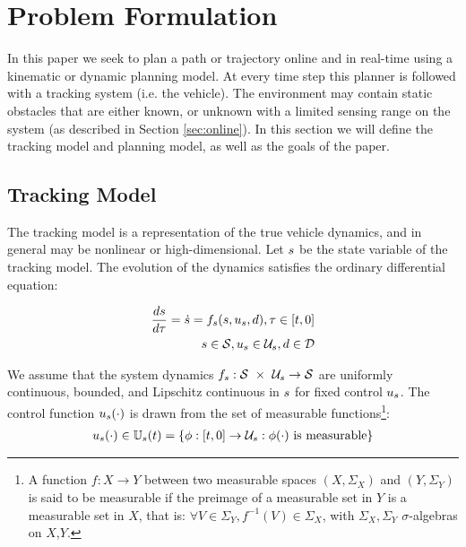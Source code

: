 \section{Problem Formulation \label{sec:formulation}}
In this paper we seek to plan a path or trajectory online and in real-time using a kinematic or dynamic planning model. At every time step this planner is followed with a tracking system (i.e. the vehicle). The environment may contain static obstacles that are either known, or unknown with a limited sensing range on the system (as described in Section \ref{sec:online}). In this section we will define the tracking model and planning model, as well as the goals of the paper.

\subsection{Tracking Model}
The tracking model is a representation of the true vehicle dynamics, and in general may be nonlinear or high-dimensional. Let $s$ be the state variable of the tracking model. The evolution of the dynamics satisfies the ordinary differential equation:

\begin{equation}
\begin{aligned}
\label{eq:tdyn}
\frac{ds}{d\tau} = \dot{s} = f_s(s, u_s, d), \tau \in [t, 0] \\
s \in \mathcal{S}, u_s \in \mathcal{U}_s, d \in \mathcal{D}
\end{aligned}
\end{equation}

We assume that the system dynamics $f_s : \mathcal{S}\ \times\ \mathcal{U}_s \rightarrow \mathcal{S}$ are uniformly continuous, bounded, and Lipschitz continuous in $s$ for fixed control $u_s$. The control function $u_s(\cdot)$ is drawn from the set of measurable functions\footnote{A function $f:X\to Y$ between two measurable spaces $(X,\Sigma_X)$ and $(Y,\Sigma_Y)$ is said to be measurable if the preimage of a measurable set in $Y$ is a measurable set in $X$, that is: $\forall V\in\Sigma_Y, f^{-1}(V)\in\Sigma_X$, with $\Sigma_X,\Sigma_Y$ $\sigma$-algebras on $X$,$Y$.}:
\begin{equation}
\begin{aligned}
u_s(\cdot) \in \mathbb{U}_s(t) = \{\phi: [t, 0] \rightarrow \mathcal{U}_s: \phi(\cdot) \text{ is measurable}\}
\end{aligned}
\end{equation}

